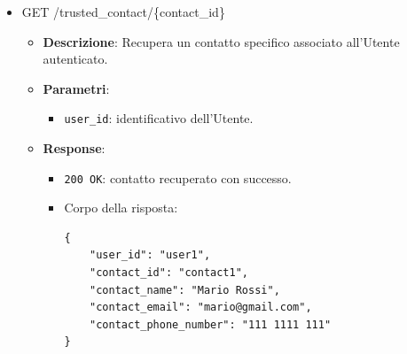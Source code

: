 \documentclass[a4paper,12pt]{article}
\newcommand{\code}[1]{{\ttfamily\textcolor{purple!85!black}{#1}}}
\begin{document}
\begin{itemize}
\begin{itemize}
            \item \textbf{Parametri}:
            \begin{itemize}
                \item \texttt{user\_id}: identificativo dell’Utente.
            \end{itemize}

            \item \textbf{Response}:
            \begin{itemize}
                \item \texttt{200 OK}: contatti recuperati con successo.
                \item Corpo della risposta:
\begin{verbatim}
{
    "trusted_contacts": [
        {
            "user_id": "user1",
            "contact_id": "contact1",
            "contact_name": "Mario Rossi",
            "contact_email": "mario@gmail.com",
            "contact_phone_number": "111 1111 111"
        },
        {
            "user_id": "user1",
            "contact_id": "contact2",
            "contact_name": "Luigi Verdi",
            "contact_email": "luigi@gmail.com",
            "contact_phone_number": "333 2222 222"
        }
    ]
}
\end{verbatim}
            \end{itemize}
        \end{itemize}

    \item \code{GET /trusted\_contact/\{contact\_id\}}
        \begin{itemize}
            \item \textbf{Descrizione}: Recupera un contatto specifico associato all’Utente autenticato.
            
            \item \textbf{Parametri}:
            \begin{itemize}
                \item \texttt{user\_id}: identificativo dell’Utente.
            \end{itemize}

            \item \textbf{Response}:
            \begin{itemize}
                \item \texttt{200 OK}: contatto recuperato con successo.
                \item Corpo della risposta:
\begin{verbatim}
{
    "user_id": "user1",
    "contact_id": "contact1",
    "contact_name": "Mario Rossi",
    "contact_email": "mario@gmail.com",
    "contact_phone_number": "111 1111 111"
}
\end{verbatim}
            \end{itemize}


\end{itemize}
\end{itemize}
\end{document}
